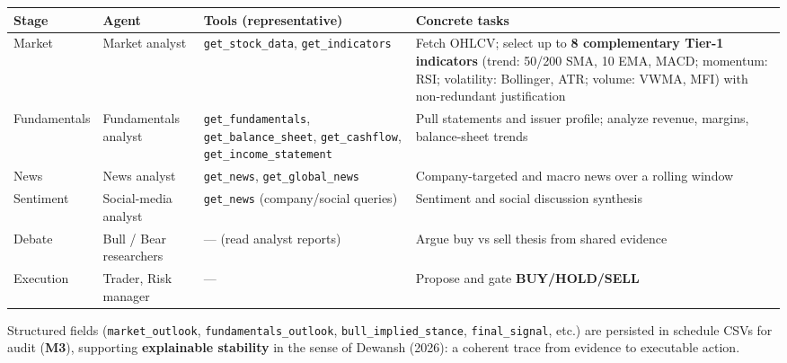 \documentclass[
]{article}
\newcounter{none} %
\begin{document}
{\def\LTcaptype{none} %
\begin{longtable}[]{@{}
  >{\raggedright\arraybackslash}p{}
  >{\raggedright\arraybackslash}p{}
  >{\raggedright\arraybackslash}p{}
  >{\raggedright\arraybackslash}p{}@{}}
\toprule\noalign{}
\begin{minipage}[b]{\linewidth}\raggedright
Stage
\end{minipage} & \begin{minipage}[b]{\linewidth}\raggedright
Agent
\end{minipage} & \begin{minipage}[b]{\linewidth}\raggedright
Tools (representative)
\end{minipage} & \begin{minipage}[b]{\linewidth}\raggedright
Concrete tasks
\end{minipage} \\
\midrule\noalign{}
\endhead
\bottomrule\noalign{}
\endlastfoot
Market & Market analyst & \texttt{get\_stock\_data},
\texttt{get\_indicators} & Fetch OHLCV; select up to \textbf{8
complementary Tier-1 indicators} (trend: 50/200 SMA, 10 EMA, MACD;
momentum: RSI; volatility: Bollinger, ATR; volume: VWMA, MFI) with
non-redundant justification \\
Fundamentals & Fundamentals analyst & \texttt{get\_fundamentals},
\texttt{get\_balance\_sheet}, \texttt{get\_cashflow},
\texttt{get\_income\_statement} & Pull statements and issuer profile;
analyze revenue, margins, balance-sheet trends \\
News & News analyst & \texttt{get\_news}, \texttt{get\_global\_news} &
Company-targeted and macro news over a rolling window \\
Sentiment & Social-media analyst & \texttt{get\_news} (company/social
queries) & Sentiment and social discussion synthesis \\
Debate & Bull / Bear researchers & --- (read analyst reports) & Argue
buy vs sell thesis from shared evidence \\
Execution & Trader, Risk manager & --- & Propose and gate
\textbf{BUY/HOLD/SELL} \\
\end{longtable}
}

Structured fields (\texttt{market\_outlook},
\texttt{fundamentals\_outlook}, \texttt{bull\_implied\_stance},
\texttt{final\_signal}, etc.) are persisted in schedule CSVs for audit
(\textbf{M3}), supporting \textbf{explainable stability} in the sense of
Dewansh (2026): a coherent trace from evidence to executable action.
\end{document}
